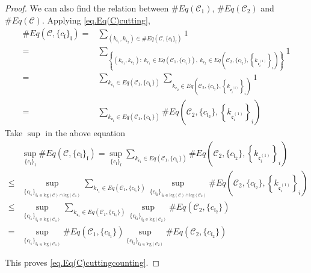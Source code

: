 \begin{proof}
We can also find the relation between $\#Eq(\mathcal{C}_1)$, $\#Eq(\mathcal{C}_2)$ and $\#Eq(\mathcal{C})$. Applying \eqref{eq.Eq(C)cutting},
\begin{equation}
\begin{split}
 \#Eq(\mathcal{C},\{c_{\mathfrak{l}}\}_{\mathfrak{l}})=&\sum_{(k_{\mathfrak{e}_1},k_{\mathfrak{e}_{2}})\in \#Eq(\mathcal{C},\{c_{\mathfrak{l}}\}_{\mathfrak{l}})} 1
 \\
 =&\sum_{\left\{(k_{\mathfrak{e}_1},k_{\mathfrak{e}_{2}}):\ k_{\mathfrak{e}_1}\in Eq(\mathcal{C}_1,\{c_{\mathfrak{l}_1}\}),\  k_{\mathfrak{e}_{2}}\in Eq\left(\mathcal{C}_{2}, \{c_{\mathfrak{l}_2}\}, \left\{k_{\mathfrak{e}_{i}^{(1)}}\right\}_{i}\right)\right\}} 1
 \\
 =&\sum_{k_{\mathfrak{e}_1}\in Eq(\mathcal{C}_1,\{c_{\mathfrak{l}_1}\})} \sum_{k_{\mathfrak{e}_{2}}\in Eq\left(\mathcal{C}_{2}, \{c_{\mathfrak{l}_2}\}, \left\{k_{\mathfrak{e}_{i}^{(1)}}\right\}_{i}\right)} 1
 \\
 =&\sum_{k_{\mathfrak{e}_1}\in Eq(\mathcal{C}_1,\{c_{\mathfrak{l}_1}\})} \# Eq\left(\mathcal{C}_{2}, \{c_{\mathfrak{l}_2}\}, \left\{k_{\mathfrak{e}_{i}^{(1)}}\right\}_{i}\right)
\end{split}
\end{equation}
Take $\sup$ in the above equation
\begin{equation}
\begin{split}
 &\sup_{\{c_{\mathfrak{l}}\}_{\mathfrak{l}}}\#Eq(\mathcal{C},\{c_{\mathfrak{l}}\}_{\mathfrak{l}})
 =\sup_{\{c_{\mathfrak{l}}\}_{\mathfrak{l}}}\sum_{k_{\mathfrak{e}_1}\in Eq(\mathcal{C}_1,\{c_{\mathfrak{l}_1}\})} \# Eq\left(\mathcal{C}_{2}, \{c_{\mathfrak{l}_2}\}, \left\{k_{\mathfrak{e}_{i}^{(1)}}\right\}_{i}\right)
 \\
 \le &\sup_{\{c_{\mathfrak{l}_1}\}_{\mathfrak{l}_1\in \text{leg}(\mathcal{C})\cap \text{leg}(\mathcal{C}_1)} }\sum_{k_{\mathfrak{e}_1}\in Eq(\mathcal{C}_1,\{c_{\mathfrak{l}_1}\})} \sup_{\{c_{\mathfrak{l}_2}\}_{\mathfrak{l}_2\in \text{leg}(\mathcal{C})\cap \text{leg}(\mathcal{C}_2)} }\# Eq\left(\mathcal{C}_{2}, \{c_{\mathfrak{l}_2}\}, \left\{k_{\mathfrak{e}_{i}^{(1)}}\right\}_{i}\right)
 \\
 \le &\sup_{\{c_{\mathfrak{l}_1}\}_{\mathfrak{l}_1\in \text{leg}(\mathcal{C}_1)} }\sum_{k_{\mathfrak{e}_1}\in Eq(\mathcal{C}_1,\{c_{\mathfrak{l}_1}\})} \sup_{\{c_{\mathfrak{l}_2}\}_{\mathfrak{l}_2\in \text{leg}(\mathcal{C}_2)} }\# Eq(\mathcal{C}_{2}, \{c_{\mathfrak{l}_2}\})
 \\
 = &\sup_{\{c_{\mathfrak{l}_1}\}_{\mathfrak{l}_1\in \text{leg}(\mathcal{C}_1)} } \# Eq(\mathcal{C}_1,\{c_{\mathfrak{l}_1}\}) \sup_{\{c_{\mathfrak{l}_2}\}_{\mathfrak{l}_2\in \text{leg}(\mathcal{C}_2)} }\# Eq(\mathcal{C}_{2}, \{c_{\mathfrak{l}_2}\})
\end{split}
\end{equation}

This proves \eqref{eq.Eq(C)cuttingcounting}.
\end{proof}



